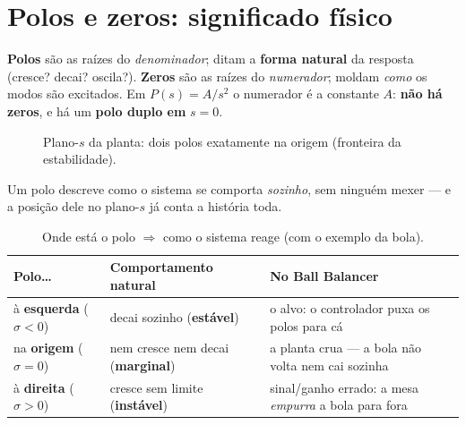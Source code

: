 \section{Polos e zeros: significado f\'isico}
\begin{conceito}[Defini\c{c}\~ao]
\textbf{Polos} s\~ao as ra\'izes do \emph{denominador}; ditam a \textbf{forma
natural} da resposta (cresce? decai? oscila?). \textbf{Zeros} s\~ao as ra\'izes do
\emph{numerador}; moldam \emph{como} os modos s\~ao excitados. Em $P(s)=A/s^2$ o
numerador \'e a constante $A$: \textbf{n\~ao h\'a zeros}, e h\'a um \textbf{polo
duplo em} $s=0$.
\end{conceito}

\begin{figure}[h]\centering
{}
\caption{Plano-$s$ da planta: dois polos exatamente na origem (fronteira da estabilidade).}
\label{fig:splane}
\end{figure}

\begin{intuicao}[Polo = a ``tend\^encia natural'' do sistema]
Um polo descreve como o sistema se comporta \emph{sozinho}, sem ningu\'em mexer ---
e a posi\c{c}\~ao dele no plano-$s$ j\'a conta a hist\'oria toda.
\end{intuicao}

\begin{table}[h]\centering
\caption{Onde est\'a o polo $\Rightarrow$ como o sistema reage (com o exemplo da bola).}
\label{tab:polos}
\small
\begin{tabularx}{\textwidth}{l l X}
\toprule
Polo\dots & Comportamento natural & No Ball Balancer \\
\midrule
\`a \textbf{esquerda} ($\sigma<0$) & decai sozinho (\textbf{est\'avel}) & o alvo: o controlador puxa os polos para c\'a \\
na \textbf{origem} ($\sigma=0$) & nem cresce nem decai (\textbf{marginal}) & a planta crua --- a bola n\~ao volta nem cai sozinha \\
\`a \textbf{direita} ($\sigma>0$) & cresce sem limite (\textbf{inst\'avel}) & sinal/ganho errado: a mesa \emph{empurra} a bola para fora \\
\bottomrule
\end{tabularx}
\end{table}

